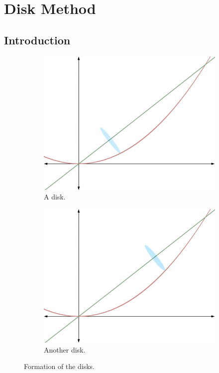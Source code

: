 \documentclass{article}
\begin{document}
\section{Disk Method}
\subsection{Introduction}

\begin{figure}[h!]
  \centering
  \begin{subfigure}[b]{0.4\linewidth}
    \includegraphics[width=\linewidth]{Blender/ParabolaLineIntegration-DiskDisk1-f2_0001.png}
    \caption{A disk.}
    \label{fig:diska}
  \end{subfigure}
  \begin{subfigure}[b]{0.4\linewidth}
    \includegraphics[width=\linewidth]{Blender/ParabolaLineIntegration-DiskDisk2-f2_0001.png}
    \caption{Another disk.}
    \label{fig:diskb}
  \end{subfigure}
  \caption{Formation of the disks.}
  \label{fig:disk1}
\end{figure}
\end{document}
